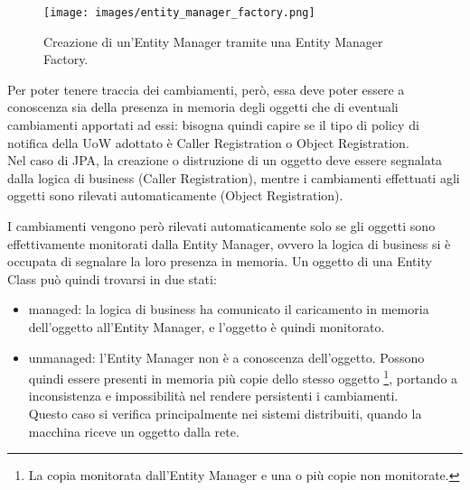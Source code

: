 \begin{figure}[h]
    \centering
    \texttt{[image: images/entity\_manager\_factory.png]}
    \caption{Creazione di un'Entity Manager tramite una Entity Manager Factory.}
    \label{fig:ent_man_factory}
\end{figure}

Per poter tenere traccia dei cambiamenti, però, essa deve poter essere a conoscenza sia della presenza in memoria degli oggetti che di eventuali cambiamenti apportati ad essi: bisogna quindi capire se il tipo di policy di notifica della UoW adottato è Caller Registration o Object Registration.\\
Nel caso di JPA, la creazione o distruzione di un oggetto deve essere segnalata dalla logica di business (Caller Registration), mentre i cambiamenti effettuati agli oggetti sono rilevati automaticamente (Object Registration).

I cambiamenti vengono però rilevati automaticamente solo se gli oggetti sono effettivamente monitorati dalla Entity Manager, ovvero la logica di business si è occupata di segnalare la loro presenza in memoria.
Un oggetto di una Entity Class può quindi trovarsi in due stati:
\begin{itemize}
    \item managed: la logica di business ha comunicato il caricamento in memoria dell'oggetto all'Entity Manager, e l'oggetto è quindi monitorato.
    \item unmanaged: l'Entity Manager non è a conoscenza dell'oggetto. Possono quindi essere presenti in memoria più copie dello stesso oggetto \footnote{La copia monitorata dall'Entity Manager e una o più copie non monitorate.}, portando a inconsistenza e impossibilità nel rendere persistenti i cambiamenti.\\
    Questo caso si verifica principalmente nei sistemi distribuiti, quando la macchina riceve un oggetto dalla rete.
\end{itemize}

